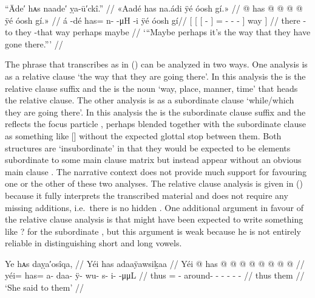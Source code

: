 \ex\label{ex:92-38-maybe-perhaps-they-went-there}%
%
\begingl
	\glpreamble	“Āde′ hᴀs naade′ ỵa-ū′ckî.” //
	\glpreamble	«\!Aadé has na.ádi ÿé óosh gí.\!» //
	\gla	{} {} {}  @ {} {}
			has @  @ {} @ {} @ {} {} ÿé {}
		óosh gí.\!» //
	\glb	{} {} {} á -dé {}
			has= n-  -μH -i {} ÿé {}
		óosh gí//
	\glc	{}[ {}[ {}[  - {}]
			= -  - - {}] way {}]
		  //
	\gld	{} {} {} there -to {}
			they  {} {} -that {} way {}
		perhaps maybe //
	\glft	‘“Maybe perhaps it’s the way that they have gone there.”’
		//
\endgl
\xe

The phrase that \citeauthor{swanton:1909} transcribes as  in (\lastx) can be analyzed in two ways.
One analysis is as a relative clause  ‘the way that they are going there’.
In this analysis the  is the relative clause suffix  and the  is the noun  ‘way, place, manner, time’ that heads the relative clause.
The other analysis is as a subordinate clause  ‘while/which they are going there’.
In this analysis the  is the subordinate clause suffix  and the  reflects the focus particle , perhaps blended together with the subordinate clause as something like [] without the expected glottal stop between them.
Both structures are ‘insubordinate’ in that they would be expected to be elements subordinate to some main clause matrix but instead appear without an obvious main clause \parencite{cable:2011}.
The narrative context does not provide much support for favouring one or the other of these two analyses.
The relative clause analysis is given in (\lastx) because it fully interprets the transcribed material and does not require any missing additions, i.e.\ there is no hidden .
One additional argument in favour of the relative clause analysis is that \citeauthor{swanton:1909} might have been expected to write something like ? for the subordinate , but this argument is weak because he is not entirely reliable in distinguishing short and long vowels.

\ex\label{ex:92-39-said-to-them}%
%
\begingl
	\glpreamble	Ye hᴀs daỵa′osîqa, //
	\glpreamble	Yéi has adaaÿawsiḵaa //
	\gla	Yéi @ has @  @ {} @ {} @ {} @ {} @ {} @ {} @ {} //
	\glb	yéi= has= a- daa- ÿ- wu- s- i-  -μμL //
	\glc	thus = - around- - - - -
			 - //
	\gld	thus them  {} {} {} {} {} {} {} //
	\glft	‘She said to them’
		//
\endgl
\xe

